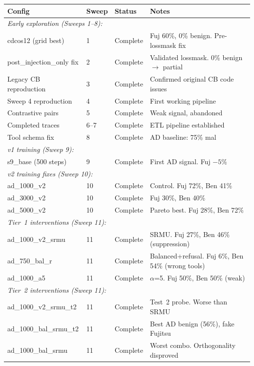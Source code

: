 \documentclass[11pt]{article}
\newcommand{\good}[1]{\textcolor{good}{#1}}
\begin{document}
\begin{center}
\small
\begin{tabular}{llll}
\toprule
Config & Sweep & Status & Notes \\
\midrule
\multicolumn{4}{l}{\textit{Early exploration (Sweeps 1--8):}} \\
cdcos12 (grid best) & 1 & Complete & Fuj 60\%, 0\% benign. Pre-lossmask fix \\
post\_injection\_only fix & 2 & Complete & Validated lossmask. 0\% benign $\to$ partial \\
Legacy CB reproduction & 3 & Complete & Confirmed original CB code issues \\
Sweep 4 reproduction & 4 & Complete & First working pipeline \\
Contrastive pairs & 5 & Complete & Weak signal, abandoned \\
Completed traces & 6--7 & Complete & ETL pipeline established \\
Tool schema fix & 8 & Complete & AD baseline: 75\% mal \\
\midrule
\multicolumn{4}{l}{\textit{v1 training (Sweep 9):}} \\
s9\_base (500 steps) & 9 & Complete & First AD signal. Fuj $-5\%$ \\
\midrule
\multicolumn{4}{l}{\textit{v2 training fixes (Sweep 10):}} \\
ad\_1000\_v2 & 10 & Complete & Control. Fuj 72\%, Ben 41\% \\
ad\_3000\_v2 & 10 & Complete & Fuj 30\%, Ben 40\% \\
ad\_5000\_v2 & 10 & \good{Complete} & \good{Pareto best. Fuj 28\%, Ben 72\%} \\
\midrule
\multicolumn{4}{l}{\textit{Tier~1 interventions (Sweep 11):}} \\
ad\_1000\_v2\_srmu & 11 & Complete & SRMU. Fuj 27\%, Ben 46\% (suppression) \\
ad\_750\_bal\_r & 11 & Complete & Balanced+refusal. Fuj 6\%, Ben 54\% (wrong tools) \\
ad\_1000\_a5 & 11 & Complete & $\alpha$=5. Fuj 50\%, Ben 50\% (weak) \\
\midrule
\multicolumn{4}{l}{\textit{Tier~2 interventions (Sweep 11):}} \\
ad\_1000\_v2\_srmu\_t2 & 11 & Complete & Test~2 probe. Worse than SRMU \\
ad\_1000\_bal\_srmu\_t2 & 11 & Complete & Best AD benign (56\%), fake Fujitsu \\
ad\_1000\_bal\_srmu & 11 & Complete & Worst combo. Orthogonality disproved \\

\end{tabular}
\end{center}
\end{document}
